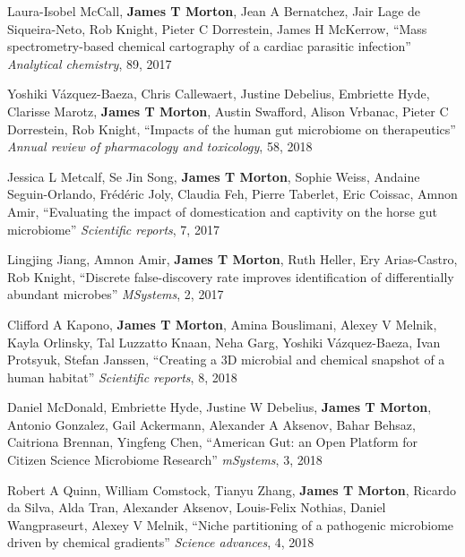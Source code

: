 \begin{frontmatter}
\begin{vitapage}
\begin{publications}
    \item  Laura-Isobel McCall, \textbf{James T Morton}, Jean A  Bernatchez, Jair Lage  de Siqueira-Neto, Rob  Knight, Pieter C  Dorrestein, James H  McKerrow,  ``Mass spectrometry-based chemical cartography of a cardiac parasitic infection'' \emph{Analytical chemistry}, 89, 2017

    \item  Yoshiki Vázquez-Baeza, Chris  Callewaert, Justine  Debelius, Embriette  Hyde, Clarisse  Marotz, \textbf{James T Morton}, Austin  Swafford, Alison  Vrbanac, Pieter C  Dorrestein, Rob  Knight,  ``Impacts of the human gut microbiome on therapeutics'' \emph{Annual review of pharmacology and toxicology}, 58, 2018

    \item  Jessica L Metcalf, Se Jin  Song, \textbf{James T Morton}, Sophie  Weiss, Andaine  Seguin-Orlando, Frédéric  Joly, Claudia  Feh, Pierre  Taberlet, Eric  Coissac, Amnon  Amir,  ``Evaluating the impact of domestication and captivity on the horse gut microbiome'' \emph{Scientific reports}, 7, 2017

    \item  Lingjing Jiang, Amnon  Amir, \textbf{James T Morton}, Ruth  Heller, Ery  Arias-Castro, Rob  Knight,  ``Discrete false-discovery rate improves identification of differentially abundant microbes'' \emph{MSystems}, 2, 2017

    \item  Clifford A Kapono, \textbf{James T Morton}, Amina  Bouslimani, Alexey V  Melnik, Kayla  Orlinsky, Tal Luzzatto  Knaan, Neha  Garg, Yoshiki  Vázquez-Baeza, Ivan  Protsyuk, Stefan  Janssen,  ``Creating a 3D microbial and chemical snapshot of a human habitat'' \emph{Scientific reports}, 8, 2018

    \item  Daniel McDonald, Embriette  Hyde, Justine W  Debelius, \textbf{James T Morton}, Antonio  Gonzalez, Gail  Ackermann, Alexander A  Aksenov, Bahar  Behsaz, Caitriona  Brennan, Yingfeng  Chen,  ``American Gut: an Open Platform for Citizen Science Microbiome Research'' \emph{mSystems}, 3, 2018


    \item  Robert A Quinn, William  Comstock, Tianyu  Zhang, \textbf{James T Morton}, Ricardo  da Silva, Alda  Tran, Alexander  Aksenov, Louis-Felix  Nothias, Daniel  Wangpraseurt, Alexey V  Melnik,  ``Niche partitioning of a pathogenic microbiome driven by chemical gradients'' \emph{Science advances}, 4, 2018
\end{publications}
\end{vitapage}



\end{frontmatter}
